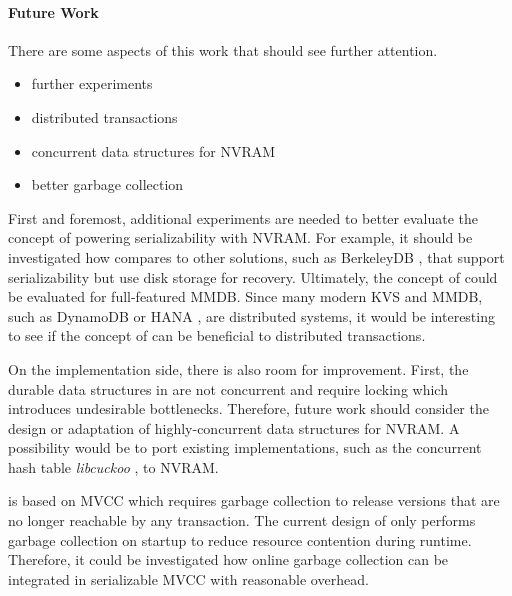 \paragraph{Future Work}

There are some aspects of this work that should see further attention.

\begin{itemize}
    \item further experiments
    \item distributed transactions
    \item concurrent data structures for NVRAM
    \item better garbage collection
\end{itemize}

First and foremost, additional experiments are needed to better evaluate the
concept of powering serializability with NVRAM. For example, it should be
investigated how \midas compares to other solutions, such as BerkeleyDB
\cite{olson1999berkeley}, that support serializability but use disk storage for
recovery. Ultimately, the concept of \midas could be evaluated for full-featured
MMDB. Since many modern KVS and MMDB, such as DynamoDB \cite{decandia2007dynamo}
or HANA \cite{lee2013sap}, are distributed systems, it would be interesting to
see if the concept of \midas can be beneficial to distributed transactions.

On the implementation side, there is also room for improvement. First, the
durable data structures in \midas are not concurrent and require locking which
introduces undesirable bottlenecks. Therefore, future work should consider the
design or adaptation of highly-concurrent data structures for NVRAM. A
possibility would be to port existing implementations, such as the concurrent
hash table \emph{libcuckoo} \cite{li2014algorithmic}, to NVRAM.

\midas is based on MVCC which requires garbage collection to release versions
that are no longer reachable by any transaction. The current design of \midas
only performs garbage collection on startup to reduce resource contention during
runtime. Therefore, it could be investigated how online garbage collection
can be integrated in serializable MVCC with reasonable overhead.
